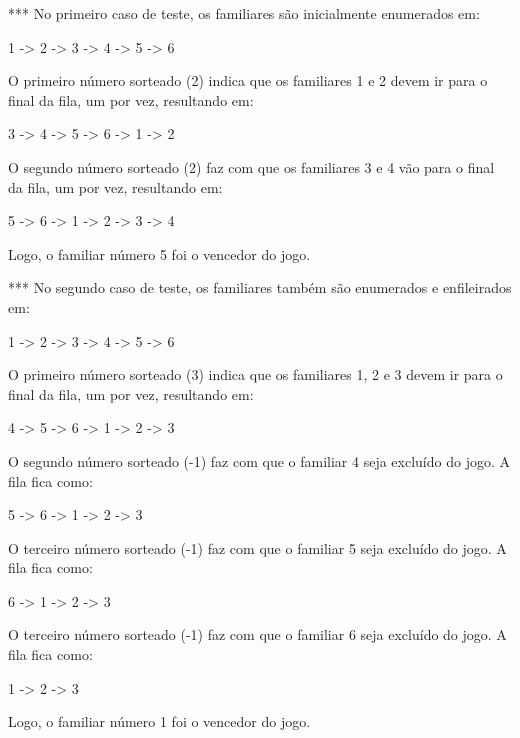 *** No primeiro caso de teste, os familiares são inicialmente enumerados em:

1 -> 2 -> 3 -> 4 -> 5 -> 6

O primeiro número sorteado (2) indica que os familiares 1 e 2 devem ir para o final da fila, um por vez, resultando em:

3 -> 4 -> 5 -> 6 -> 1 -> 2

O segundo número sorteado (2) faz com que os familiares 3 e 4 vão para o final da fila, um por vez, resultando em:

5 -> 6 -> 1 -> 2 -> 3 -> 4 

Logo, o familiar número 5 foi o vencedor do jogo.

*** No segundo caso de teste, os familiares também são enumerados e enfileirados em:

1 -> 2 -> 3 -> 4 -> 5 -> 6

O primeiro número sorteado (3) indica que os familiares 1, 2 e 3 devem ir para o final da fila, um por vez, resultando em:

4 -> 5 -> 6 -> 1 -> 2 -> 3 

O segundo número sorteado (-1) faz com que o familiar 4 seja excluído do jogo. A fila fica como:

5 -> 6 -> 1 -> 2 -> 3 

O terceiro número sorteado (-1) faz com que o familiar 5 seja excluído do jogo. A fila fica como:

6 -> 1 -> 2 -> 3

O terceiro número sorteado (-1) faz com que o familiar 6 seja excluído do jogo. A fila fica como:

1 -> 2 -> 3

Logo, o familiar número 1 foi o vencedor do jogo.
